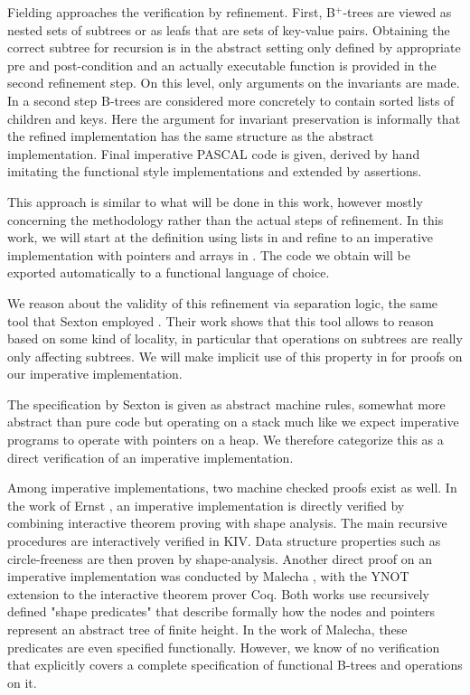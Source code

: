 Fielding approaches the verification by refinement.
First, B$^+$-trees are viewed as nested sets of subtrees
or as leafs that are sets of key-value pairs.
Obtaining the correct subtree for recursion is in the abstract setting
only defined by appropriate pre and post-condition
and an actually executable function is provided in the second refinement step.
On this level, only arguments on the invariants are made.
In a second step B-trees are considered more concretely to contain
sorted lists of children and keys.
Here the argument for invariant preservation is informally
that the refined implementation
has the same structure as the abstract implementation.
Final imperative PASCAL code is given, derived by hand
imitating the functional style implementations and extended by assertions.

This approach is similar to what will be done in this work,
however mostly concerning the methodology rather than the actual
steps of refinement.
In this work, we will start at the definition using lists in 
and refine to an imperative implementation with pointers and arrays in .
The code we obtain will be exported automatically to a functional language of choice.

We reason about the validity of this refinement via separation logic,
the same tool that Sexton employed \parencite{DBLP:journals/entcs/SextonT08}.
Their work shows that this tool allows to reason based on some kind of locality,
in particular that operations on subtrees are really only affecting subtrees.
We will make implicit use of this property in 
for proofs on our imperative implementation.

The specification by Sexton is given as abstract machine rules,
somewhat more abstract than pure code but operating on a stack
much like we expect imperative programs to operate with pointers on a heap.
We therefore categorize this as a direct verification of an imperative implementation.

Among imperative implementations, two machine checked proofs exist as well.
In the work of Ernst \parencite{DBLP:journals/sosym/ErnstSR15},
an imperative implementation is directly verified
by combining interactive theorem proving 
with shape analysis.
The main recursive procedures are interactively verified in KIV.
Data structure properties such as circle-freeness are then proven by shape-analysis.
Another direct proof on an imperative implementation 
was conducted by Malecha \parencite{DBLP:conf/popl/MalechaMSW10}, with the YNOT
extension to the interactive theorem prover Coq.
Both works use recursively defined "shape predicates"
that describe formally how the nodes and pointers
represent an abstract tree of finite height.
In the work of Malecha, these predicates are even specified functionally.
However, we know of no verification that explicitly covers
a complete specification of functional B-trees and operations on it.

